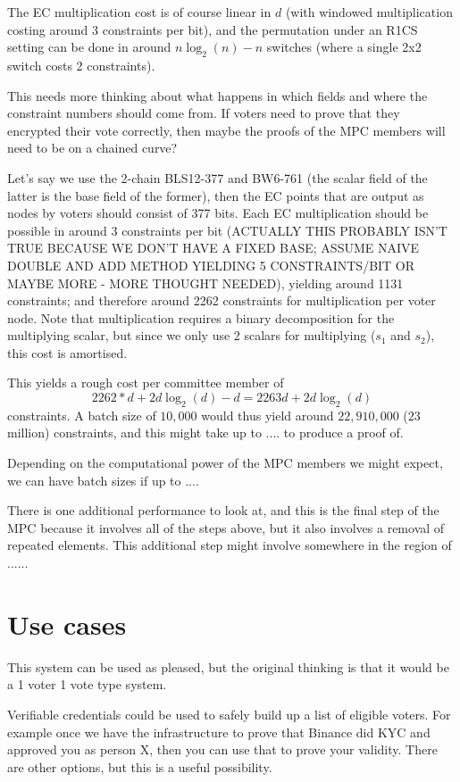 \documentclass{article}
\begin{document}
The EC multiplication cost is of course linear in $d$ (with windowed multiplication costing around 3 constraints per bit), and the permutation under an R1CS setting can be done in around $n\log_2(n)-n$ switches (where a single 2x2 switch costs 2 constraints).

This needs more thinking about what happens in which fields and where the constraint numbers should come from. If voters need to prove that they encrypted their vote correctly, then maybe the proofs of the MPC members will need to be on a chained curve?

Let's say we use the 2-chain BLS12-377 and BW6-761 (the scalar field of the latter is the base field of the former), then the EC points that are output as nodes by voters should consist of 377 bits. Each EC multiplication should be possible in around 3 constraints per bit (ACTUALLY THIS PROBABLY ISN'T TRUE BECAUSE WE DON'T HAVE A FIXED BASE; ASSUME NAIVE DOUBLE AND ADD METHOD YIELDING 5 CONSTRAINTS/BIT OR MAYBE MORE - MORE THOUGHT NEEDED), yielding around 1131 constraints; and therefore around 2262 constraints for multiplication per voter node. Note that multiplication requires a binary decomposition for the multiplying scalar, but since we only use 2 scalars for multiplying ($s_1$ and $s_2$), this cost is amortised.

This yields a rough cost per committee member of
$$ 2262*d + 2d\log_2(d) - d = 2263d + 2d\log_2(d)
$$ 
constraints. A batch size of $10,000$ would thus yield around $22,910,000$ ($23$ million) constraints, and this might take up to .... to produce a proof of.

Depending on the computational power of the MPC members we might expect, we can have batch sizes if up to ....

There is one additional performance to look at, and this is the final step of the MPC because it involves all of the steps above, but it also involves a removal of repeated elements. This additional step might involve somewhere in the region of ......


\section{Use cases}
This system can be used as pleased, but the original thinking is that it would be a 1 voter 1 vote type system. 

Verifiable credentials could be used to safely build up a list of eligible voters. For example once we have the infrastructure to prove that Binance did KYC and approved you as person X, then you can use that to prove your validity. There are other options, but this is a useful possibility.
\end{document}
